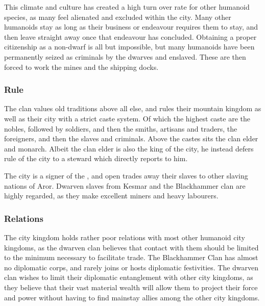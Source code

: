This climate and culture has created a high turn over rate for other humanoid
species, as many feel alienated and excluded within the city. Many other
humanoids stay as long as their business or endeavour requires them to stay,
and then leave straight away once that endeavour has concluded. Obtaining a
proper citizenship as a non-dwarf is all but impossible, but many humanoids
have been permanently seized as criminals by the dwarves and enslaved. These
are then forced to work the mines and the shipping docks.

\subsubsection{Rule}

The clan values old traditions above all else, and rules their mountain
kingdom as well as their city with a strict caste system. Of which the highest
caste are the nobles, followed by soldiers, and then the smiths, artisans and
traders, the foreigners, and then the slaves and criminals. Above the castes
sits the clan elder and monarch. Albeit the clan elder is also the king of the
city, he instead defers rule of the city to a steward which directly reports
to him.

The city is a signer of the , and open trades away
their slaves to other slaving nations of Aror. Dwarven slaves from Kesmar and
the Blackhammer clan are highly regarded, as they make excellent miners and
heavy labourers.

\subsubsection{Relations}

The city kingdom holds rather poor relations with most other humanoid city
kingdoms, as the dwarven clan believes that contact with them should be limited
to the minimum necessary to facilitate trade. The Blackhammer Clan has almost no
diplomatic corps, and rarely joins or hosts diplomatic festivities. The
dwarven clan wishes to limit their diplomatic entanglement with other city
kingdoms, as they believe that their vast material wealth will allow them to
project their force and power without having to find mainstay allies among the
other city kingdoms.
